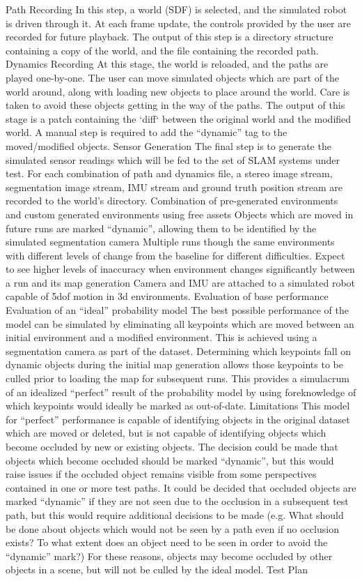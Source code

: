Path Recording
In this step, a world (SDF) is selected, and the simulated robot is driven through it. At each frame update, the controls provided by the user are recorded for future playback. The output of this step is a directory structure containing a copy of the world, and the file containing the recorded path.
Dynamics Recording
At this stage, the world is reloaded, and the paths are played one-by-one. The user can move simulated objects which are part of the world around, along with loading new objects to place around the world. Care is taken to avoid these objects getting in the way of the paths. The output of this stage is a patch containing the `diff` between the original world and the modified world. A manual step is required to add the “dynamic” tag to the moved/modified objects.
Sensor Generation
The final step is to generate the simulated sensor readings which will be fed to the set of SLAM systems under test. For each combination of path and dynamics file, a stereo image stream, segmentation image stream, IMU stream and ground truth position stream are recorded to the world’s directory.
Combination of pre-generated environments and custom generated environments using free assets
Objects which are moved in future runs are marked “dynamic”, allowing them to be identified by the simulated segmentation camera
Multiple runs though the same environments with different levels of change from the baseline for different difficulties. Expect to see higher levels of inaccuracy when environment changes significantly between a run and its map generation
Camera and IMU are attached to a simulated robot capable of 5dof motion in 3d environments.
Evaluation of base performance
Evaluation of an “ideal” probability model
The best possible performance of the model can be simulated by eliminating all keypoints which are moved between an initial environment and a modified environment. This is achieved using a segmentation camera as part of the dataset. Determining which keypoints fall on dynamic objects during the initial map generation allows those keypoints to be culled prior to loading the map for subsequent runs. This provides a simulacrum of an idealized “perfect” result of the probability model by using foreknowledge of which keypoints would ideally be marked as out-of-date.
Limitations
This model for “perfect” performance is capable of identifying objects in the original dataset which are moved or deleted, but is not capable of identifying objects which become occluded by new or existing objects. The decision could be made that objects which become occluded should be marked “dynamic”, but this would raise issues if the occluded object remains visible from some perspectives contained in one or more test paths. It could be decided that occluded objects are marked “dynamic” if they are not seen due to the occlusion in a subsequent test path, but this would require additional decisions to be made (e.g. What should be done about objects which would not be seen by a path even if no occlusion exists? To what extent does an object need to be seen in order to avoid the “dynamic” mark?) For these reasons, objects may become occluded by other objects in a scene, but will not be culled by the ideal model.
Test Plan

